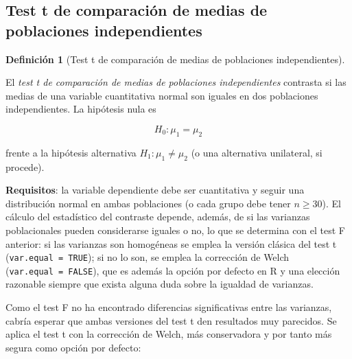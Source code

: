 \documentclass[
  spanish,
  a4paper,
]{scrreport}
\theoremstyle{definition}
\theoremstyle{definition}
\newtheorem{definition}{Definición}[chapter]
\theoremstyle{remark}
\begin{document}
\subsection{Test t de comparación de medias de poblaciones
independientes}\label{test-t-de-comparaciuxf3n-de-medias-de-poblaciones-independientes}

\begin{definition}[Test t de comparación de medias de poblaciones
independientes]\protect\hypertarget{def-dosindep-test-t}{}\label{def-dosindep-test-t}

El \emph{test t de comparación de medias de poblaciones independientes}
contrasta si las medias de una variable cuantitativa normal son iguales
en dos poblaciones independientes. La hipótesis nula es

\[H_0: \mu_1 = \mu_2\]

frente a la hipótesis alternativa \(H_1: \mu_1 \neq \mu_2\) (o una
alternativa unilateral, si procede).

\end{definition}

\textbf{Requisitos}: la variable dependiente debe ser cuantitativa y
seguir una distribución normal en ambas poblaciones (o cada grupo debe
tener \(n \geq 30\)). El cálculo del estadístico del contraste depende,
además, de si las varianzas poblacionales pueden considerarse iguales o
no, lo que se determina con el test F anterior: si las varianzas son
homogéneas se emplea la versión clásica del test t
(\texttt{var.equal\ =\ TRUE}); si no lo son, se emplea la corrección de
Welch (\texttt{var.equal\ =\ FALSE}), que es además la opción por
defecto en R y una elección razonable siempre que exista alguna duda
sobre la igualdad de varianzas.

Como el test F no ha encontrado diferencias significativas entre las
varianzas, cabría esperar que ambas versiones del test t den resultados
muy parecidos. Se aplica el test t con la corrección de Welch, más
conservadora y por tanto más segura como opción por defecto:
\end{document}
